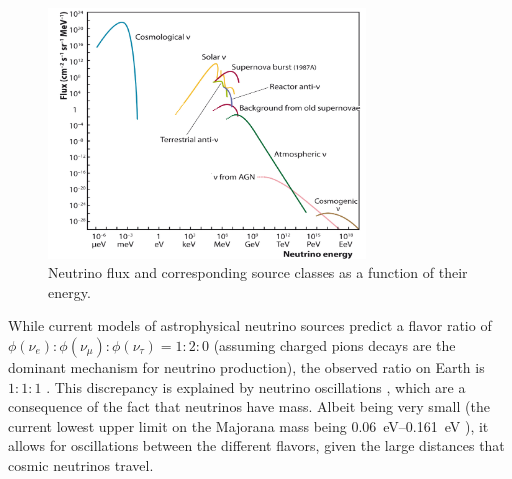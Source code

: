 \begin{figure}
  \centering
  \includegraphics[width=0.75\textwidth]{content/plots/halftime/neutrinos-energy.png}
  \caption{
    Neutrino flux and corresponding source classes as a function of their energy.
    \cite{spiering2012} %
  }
  \label{fig:neutrinos:flux_spectrum}
\end{figure}


While current models of astrophysical neutrino sources predict a flavor ratio of
  $\phi(\nu_e) : \phi(\nu_\mu) : \phi(\nu_\tau) = 1 : 2 : 0$
    (assuming charged pions decays are the dominant mechanism for neutrino production),
the observed ratio on Earth is
  $1 : 1 : 1$ \cite{neutrinos_beacom}.
This discrepancy is explained by neutrino oscillations \cite{neutrinos_beacom},
  which are a consequence of the fact that neutrinos have mass.
Albeit being very small
  (the current lowest upper limit on the Majorana mass being \qtyrange{0.06}{0.161}{\electronvolt} \cite{neutrinos_gando}),
  it allows for oscillations between the different flavors,
    given the large distances that cosmic neutrinos travel.
